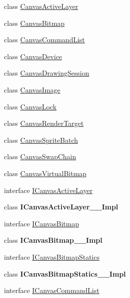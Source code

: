 \begin{DoxyCompactItemize}
\item 
class \hyperlink{class_microsoft_1_1_graphics_1_1_canvas_1_1_canvas_active_layer}{Canvas\+Active\+Layer}
\item 
class \hyperlink{class_microsoft_1_1_graphics_1_1_canvas_1_1_canvas_bitmap}{Canvas\+Bitmap}
\item 
class \hyperlink{class_microsoft_1_1_graphics_1_1_canvas_1_1_canvas_command_list}{Canvas\+Command\+List}
\item 
class \hyperlink{class_microsoft_1_1_graphics_1_1_canvas_1_1_canvas_device}{Canvas\+Device}
\item 
class \hyperlink{class_microsoft_1_1_graphics_1_1_canvas_1_1_canvas_drawing_session}{Canvas\+Drawing\+Session}
\item 
class \hyperlink{class_microsoft_1_1_graphics_1_1_canvas_1_1_canvas_image}{Canvas\+Image}
\item 
class \hyperlink{class_microsoft_1_1_graphics_1_1_canvas_1_1_canvas_lock}{Canvas\+Lock}
\item 
class \hyperlink{class_microsoft_1_1_graphics_1_1_canvas_1_1_canvas_render_target}{Canvas\+Render\+Target}
\item 
class \hyperlink{class_microsoft_1_1_graphics_1_1_canvas_1_1_canvas_sprite_batch}{Canvas\+Sprite\+Batch}
\item 
class \hyperlink{class_microsoft_1_1_graphics_1_1_canvas_1_1_canvas_swap_chain}{Canvas\+Swap\+Chain}
\item 
class \hyperlink{class_microsoft_1_1_graphics_1_1_canvas_1_1_canvas_virtual_bitmap}{Canvas\+Virtual\+Bitmap}
\item 
interface \hyperlink{interface_microsoft_1_1_graphics_1_1_canvas_1_1_i_canvas_active_layer}{I\+Canvas\+Active\+Layer}
\item 
class {\bfseries I\+Canvas\+Active\+Layer\+\_\+\+\_\+\+Impl}
\item 
interface \hyperlink{interface_microsoft_1_1_graphics_1_1_canvas_1_1_i_canvas_bitmap}{I\+Canvas\+Bitmap}
\item 
class {\bfseries I\+Canvas\+Bitmap\+\_\+\+\_\+\+Impl}
\item 
interface \hyperlink{interface_microsoft_1_1_graphics_1_1_canvas_1_1_i_canvas_bitmap_statics}{I\+Canvas\+Bitmap\+Statics}
\item 
class {\bfseries I\+Canvas\+Bitmap\+Statics\+\_\+\+\_\+\+Impl}
\item 
interface \hyperlink{interface_microsoft_1_1_graphics_1_1_canvas_1_1_i_canvas_command_list}{I\+Canvas\+Command\+List}

\end{DoxyCompactItemize}
